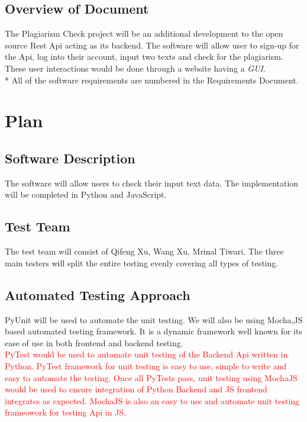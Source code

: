 \documentclass[12pt, titlepage]{article}
\begin{document}
\subsection{Overview of Document}
The Plagiarism Check project will be an additional development to the open source Rest Api acting as its backend. The software will allow user to sign-up for the Api, log into their account, input two texts and check for the plagiarism. These user interactions would be done through a website having a \textit{GUI}. \\*
All of the software requirements are numbered in the Requirements Document.

\section{Plan}
	
\subsection{Software Description}
The software will allow users to check their input text data. The implementation will be completed in Python and JavaScript.

\subsection{Test Team}
The test team will consist of Qifeng Xu, Wang Xu, Mrinal Tiwari. The three main testers will split the entire testing evenly covering all types of testing. 

\subsection{Automated Testing Approach}
PyUnit will be used to automate the unit testing.  We will also be using Mocha,JS based automated testing framework. It is a dynamic framework  well known for its ease of use in both frontend and backend testing. \\

\textcolor{red}{PyTest would be used to automate unit testing of the Backend Api written in Python. PyTest framework for unit testing is easy to use, simple to write and easy to automate the testing. Once all PyTests pass, unit testing using MochaJS would be used to ensure integration of Python Backend and JS frontend integrates as expected. MochaJS is also an easy to use and automate unit testing frameowork for testing Api in JS.} 
\end{document}
